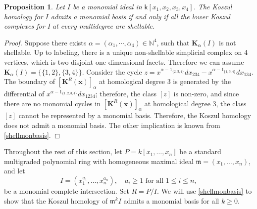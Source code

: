 \documentclass[10pt,reqno]{amsart}
\newtheorem{proposition}[subsection]{Proposition}
\theoremstyle{definition}
\newtheorem{example}[subsection]{Example}
\theoremstyle{remark}
\numberwithin{equation}{section}
\newcommand{\kk}{\mathsf k}
\newcommand{\m}{\mathfrak m}
\numberwithin{equation}{section}
\begin{document}
\begin{proposition}\label{4varclassification}
    Let $I$ be a monomial ideal in $\kk[x_1,x_2,x_3,x_4]$. The Koszul homology for $I$ admits a monomial basis if and only if all the lower Koszul complexes for I at every multidegree are shellable. 
 \end{proposition}
\begin{proof}
     Suppose there exists $\alpha=(\alpha_1,\cdots,\alpha_4)\in \mathbb{N}^4$, such that $ \mathbf{K}_{\alpha}(I)$ is not shellable. Up to labeling, there is a unique non-shellable simplicial complex on 4 vertices, which is two disjoint one-dimensional facets. Therefore we can assume $ \mathbf{K}_{\alpha}(I)=\{ \{1,2\},\{3,4\} \} $.  Consider the cycle $z=x^{\alpha-1_{\{2,3,4\}}}dx_{234}-x^{\alpha-1_{\{1,3,4\}}}dx_{134}$. The boundary of $[\mathbf K^R(\textbf{x})]_{\alpha}$ at homological degree 3 is generated by the differential of $x^{\alpha-1_{\{1,2,3,4\}}}dx_{1234}$; therefore, the class $[z]$ is non-zero, and since there are no monomial cycles in $[\mathbf K^R(\textbf{x})]_{\alpha}$ at homological degree 3, the class $[z]$ cannot be represented by a monomial basis. Therefore, the Koszul homology does not admit a monomial basis. 
The other implication is known from \cref{shellmonbasis}. 
 \end{proof}


Throughout the rest of this section, let $P=k[x_1,\ldots,x_n]$ be a standard multigraded polynomial ring with homogeneous maximal ideal $\mathfrak m=(x_1,\ldots,x_n)$, and let
\[
I=(x_1^{a_1},\ldots,x_n^{a_n}), \quad a_i\geq 1 \text{ for all } 1\leq i\leq n,
\]
be a monomial complete intersection. Set $R=P/I$. We will use \cref{shellmonbasis} to show that the Koszul homology of $\m^k I$ admits a monomial basis for all $k\geq 0$.
\end{document}
